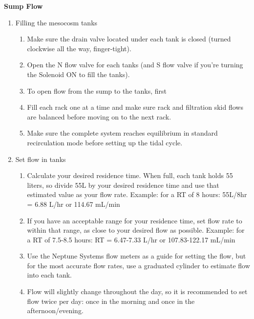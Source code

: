 \documentclass[]{book}
\providecommand{\tightlist}{%
  \setlength{\itemsep}{0pt}\setlength{\parskip}{0pt}}
\begin{document}
 \textbf{Sump Flow}

\begin{enumerate}
\def\labelenumi{\arabic{enumi}.}
\tightlist
\item
  Filling the mesocosm tanks

  \begin{enumerate}
  \def\labelenumii{\arabic{enumii}.}
  \tightlist
  \item
    Make sure the drain valve located under each tank is closed (turned
    clockwise all the way, finger-tight).
  \item
    Open the N flow valve for each tanks (and S flow valve if you're
    turning the Solenoid ON to fill the tanks).
  \item
    To open flow from the sump to the tanks, first
  \item
    Fill each rack one at a time and make sure rack and filtration skid
    flows are balanced before moving on to the next rack.
  \item
    Make sure the complete system reaches equilibrium in standard
    recirculation mode before setting up the tidal cycle.
  \end{enumerate}
\item
  Set flow in tanks

  \begin{enumerate}
  \def\labelenumii{\arabic{enumii}.}
  \tightlist
  \item
    Calculate your desired residence time. When full, each tank holds 55
    liters, so divide 55L by your desired residence time and use that
    estimated value as your flow rate. Example: for a RT of 8 hours:
    55L/8hr = 6.88 L/hr or 114.67 mL/min
  \item
    If you have an acceptable range for your residence time, set flow
    rate to within that range, as close to your desired flow as
    possible. Example: for a RT of 7.5-8.5 hours: RT = 6.47-7.33 L/hr or
    107.83-122.17 mL/min
  \item
    Use the Neptune Systems flow meters as a guide for setting the flow,
    but for the most accurate flow rates, use a graduated cylinder to
    estimate flow into each tank.
  \item
    Flow will slightly change throughout the day, so it is recommended
    to set flow twice per day: once in the morning and once in the
    afternoon/evening.
  \end{enumerate}
\end{enumerate}
\end{document}
